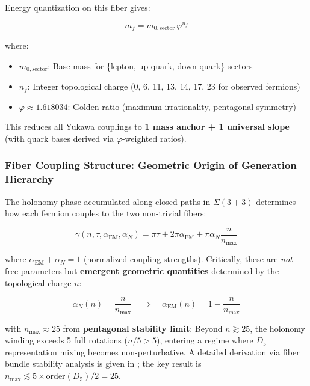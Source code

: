 \documentclass[12pt]{article}
\theoremstyle{definition}
\theoremstyle{plain}
\begin{document}
Energy quantization on this fiber gives:

\begin{equation}
\boxed{m_f = m_{0,\text{sector}} \, \varphi^{n_f}}
\end{equation}

where:
\begin{itemize}
\item \textbf{$m_{0,\text{sector}}$}: Base mass for \{lepton, up-quark, down-quark\} sectors
\item \textbf{$n_f$}: Integer topological charge (0, 6, 11, 13, 14, 17, 23 for observed fermions)
\item \textbf{$\varphi \approx 1.618034$}: Golden ratio (maximum irrationality, pentagonal symmetry)
\end{itemize}

This reduces all Yukawa couplings to \textbf{1 mass anchor + 1 universal slope} (with quark bases derived via $\varphi$-weighted ratios).

\subsubsection{Fiber Coupling Structure: Geometric Origin of Generation Hierarchy}

The holonomy phase accumulated along closed paths in $\Sigma(3+3)$ determines how each fermion couples to the two non-trivial fibers:

\begin{equation}
\gamma(n, \tau, \alpha_{\text{EM}}, \alpha_N) = \pi\tau + 2\pi\alpha_{\text{EM}} + \pi\alpha_N\frac{n}{n_{\max}}
\end{equation}

where $\alpha_{\text{EM}} + \alpha_N = 1$ (normalized coupling strengths). Critically, these are \textit{not} free parameters but \textbf{emergent geometric quantities} determined by the topological charge $n$:

\begin{equation}
\alpha_N(n) = \frac{n}{n_{\max}} \quad \Rightarrow \quad \alpha_{\text{EM}}(n) = 1 - \frac{n}{n_{\max}}
\end{equation}

with $n_{\max} \approx 25$ from \textbf{pentagonal stability limit}: Beyond $n \gtrsim 25$, the holonomy winding exceeds 5 full rotations ($n/5 > 5$), entering a regime where $D_5$ representation mixing becomes non-perturbative. A detailed derivation via fiber bundle stability analysis is given in \cite{goe_protocol_2025}; the key result is $n_{\max} \lesssim 5 \times \text{order}(D_5) / 2 = 25$.
\end{document}
